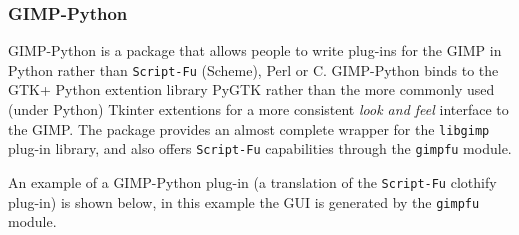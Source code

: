 \documentclass[twoside,11pt]{article}
\newcommand{\htmladdnormallink}[2]{#1}
\begin{document}
\subsubsection{GIMP-Python}

\htmladdnormallink{GIMP-Python}{http://www.daa.com.au/~james/pygimp/} is a package that allows people to write plug-ins for the GIMP in Python rather than {\tt Script-Fu} (Scheme), Perl or C. GIMP-Python binds to the \htmladdnormallink{GTK+}{http://www.gtk.org} Python extention library \htmladdnormallink{PyGTK}{http://www.daa.com.au/~james/pygtk/} rather than the more commonly used (under Python) Tkinter extentions for a more consistent {\em look and feel} interface to the GIMP. The package provides an almost complete wrapper for the {\tt libgimp} plug-in library, and also offers {\tt Script-Fu} capabilities through the {\tt gimpfu} module. 

An example of a GIMP-Python plug-in (a translation of the {\tt Script-Fu} clothify plug-in) is shown below, in this example the GUI is generated by the {\tt gimpfu} module.
\end{document}
